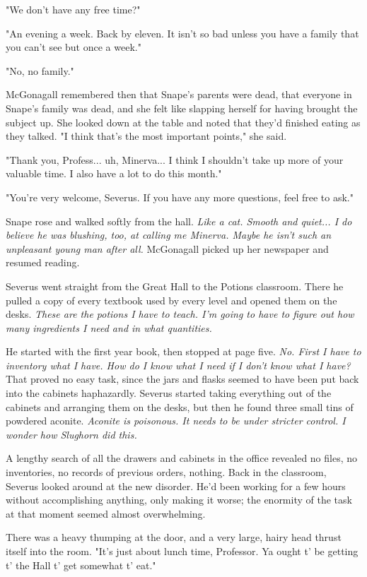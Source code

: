 "We don't have any free time?"

"An evening a week. Back by eleven. It isn't so bad unless you have a family that you can't see but once a week."

"No, no family."

McGonagall remembered then that Snape's parents were dead, that everyone in Snape's family was dead, and she felt like slapping herself for having brought the subject up. She looked down at the table and noted that they'd finished eating as they talked. "I think that's the most important points," she said.

"Thank you, Profess... uh, Minerva... I think I shouldn't take up more of your valuable time. I also have a lot to do this month."

"You're very welcome, Severus. If you have any more questions, feel free to ask."

Snape rose and walked softly from the hall. \emph{Like a cat. Smooth and quiet... I do believe he was blushing, too, at calling me Minerva. Maybe he isn't such an unpleasant young man after all.} McGonagall picked up her newspaper and resumed reading.

Severus went straight from the Great Hall to the Potions classroom. There he pulled a copy of every textbook used by every level and opened them on the desks. \emph{These are the potions I have to teach. I'm going to have to figure out how many ingredients I need and in what quantities.}

He started with the first year book, then stopped at page five. \emph{No. First I have to inventory what I have. How do I know what I need if I don't know what I have?} That proved no easy task, since the jars and flasks seemed to have been put back into the cabinets haphazardly. Severus started taking everything out of the cabinets and arranging them on the desks, but then he found three small tins of powdered aconite. \emph{Aconite is poisonous. It needs to be under stricter control. I wonder how Slughorn did this.}

A lengthy search of all the drawers and cabinets in the office revealed no files, no inventories, no records of previous orders, nothing. Back in the classroom, Severus looked around at the new disorder. He'd been working for a few hours without accomplishing anything, only making it worse; the enormity of the task at that moment seemed almost overwhelming.

There was a heavy thumping at the door, and a very large, hairy head thrust itself into the room. "It's just about lunch time, Professor. Ya ought t' be getting t' the Hall t' get somewhat t' eat."

